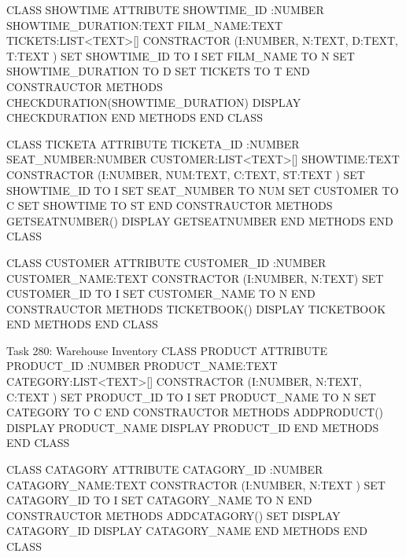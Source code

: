    CLASS SHOWTIME 
      ATTRIBUTE 
      SHOWTIME_ID :NUMBER
       SHOWTIME_DURATION:TEXT
       FILM_NAME:TEXT 
	   TICKETS:LIST<TEXT>[]
	   CONSTRACTOR (I:NUMBER, N:TEXT, D:TEXT, T:TEXT )
	    SET  SHOWTIME_ID TO I
	    SET FILM_NAME TO N
	    SET SHOWTIME_DURATION TO D
	    SET TICKETS TO T
	   END CONSTRAUCTOR   
      METHODS
	   CHECKDURATION(SHOWTIME_DURATION)
	     DISPLAY CHECKDURATION
	  END METHODS
   END CLASS

   
   CLASS TICKETA 
      ATTRIBUTE 
      TICKETA_ID :NUMBER
       SEAT_NUMBER:NUMBER
       CUSTOMER:LIST<TEXT>[] 
	   SHOWTIME:TEXT
	   CONSTRACTOR (I:NUMBER, NUM:TEXT, C:TEXT, ST:TEXT )
	    SET  SHOWTIME_ID TO I
	    SET SEAT_NUMBER TO NUM
	    SET CUSTOMER TO C
	    SET SHOWTIME TO ST
	   END CONSTRAUCTOR   
      METHODS
	   GETSEATNUMBER()
	     DISPLAY GETSEATNUMBER
	  END METHODS
   END CLASS
   
    CLASS CUSTOMER 
      ATTRIBUTE 
      CUSTOMER_ID :NUMBER
       CUSTOMER_NAME:TEXT
	   CONSTRACTOR (I:NUMBER, N:TEXT)
	    SET  CUSTOMER_ID TO I
	    SET CUSTOMER_NAME TO N
	   END CONSTRAUCTOR   
      METHODS
	   TICKETBOOK()
	     DISPLAY TICKETBOOK
	  END METHODS
   END CLASS
   
   Task 280: Warehouse Inventory
   CLASS PRODUCT 
      ATTRIBUTE 
      PRODUCT_ID :NUMBER
       PRODUCT_NAME:TEXT
       CATEGORY:LIST<TEXT>[] 
	   CONSTRACTOR (I:NUMBER, N:TEXT, C:TEXT )
	    SET  PRODUCT_ID TO I
	    SET PRODUCT_NAME TO N
	    SET CATEGORY TO C
	   END CONSTRAUCTOR   
      METHODS
	    ADDPRODUCT()
	     DISPLAY PRODUCT_NAME
		 DISPLAY PRODUCT_ID
	  END METHODS
   END CLASS
   
   CLASS CATAGORY 
      ATTRIBUTE 
      CATAGORY_ID :NUMBER
      CATAGORY_NAME:TEXT 
	   CONSTRACTOR (I:NUMBER, N:TEXT )
	    SET  CATAGORY_ID TO I
	    SET CATAGORY_NAME TO N
	   END CONSTRAUCTOR   
      METHODS
	    ADDCATAGORY()
	     SET DISPLAY CATAGORY_ID
		 DISPLAY CATAGORY_NAME
	  END METHODS
   END CLASS
   
   
   